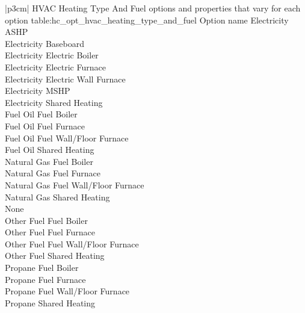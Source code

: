 \begin{customLongTable}{ |p{3cm}| }
{HVAC Heating Type And Fuel options and properties that vary for each option} {table:hc_opt_hvac_heating_type_and_fuel}
{Option name}
Electricity ASHP \\ \hline
Electricity Baseboard \\ \hline
Electricity Electric Boiler \\ \hline
Electricity Electric Furnace \\ \hline
Electricity Electric Wall Furnace \\ \hline
Electricity MSHP \\ \hline
Electricity Shared Heating \\ \hline
Fuel Oil Fuel Boiler \\ \hline
Fuel Oil Fuel Furnace \\ \hline
Fuel Oil Fuel Wall/Floor Furnace \\ \hline
Fuel Oil Shared Heating \\ \hline
Natural Gas Fuel Boiler \\ \hline
Natural Gas Fuel Furnace \\ \hline
Natural Gas Fuel Wall/Floor Furnace \\ \hline
Natural Gas Shared Heating \\ \hline
None \\ \hline
Other Fuel Fuel Boiler \\ \hline
Other Fuel Fuel Furnace \\ \hline
Other Fuel Fuel Wall/Floor Furnace \\ \hline
Other Fuel Shared Heating \\ \hline
Propane Fuel Boiler \\ \hline
Propane Fuel Furnace \\ \hline
Propane Fuel Wall/Floor Furnace \\ \hline
Propane Shared Heating \\
\end{customLongTable}
